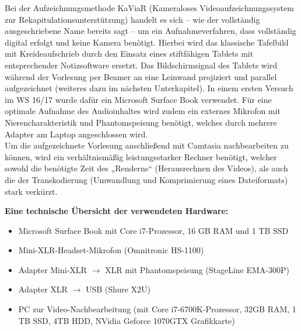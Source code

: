\documentclass{scrreprt}
\begin{document}
Bei der Aufzeichnungsmethode KaViaR (Kameraloses Videoaufzeichnungssystem zur Rekapitulationsunterstützung) handelt es sich -- wie der vollständig ausgeschriebene Name bereits sagt -- um ein Aufnahmeverfahren, dass vollständig digital erfolgt und keine Kamera benötigt. Hierbei wird das klassische Tafelbild mit Kreideaufschrieb durch den Einsatz eines stiftfähigen Tablets mit entsprechender Notizsoftware ersetzt. Das Bildschirmsignal des Tablets wird während der Vorlesung per Beamer an eine Leinwand projiziert und parallel aufgezeichnet (weiteres dazu im nächsten Unterkapitel). In einem ersten Versuch im WS 16/17 wurde dafür ein Microsoft Surface Book verwendet. Für eine optimale Aufnahme des Audioinhaltes wird zudem ein externes Mikrofon mit Nierencharakteristik und Phantomspeisung benötigt, welches durch mehrere Adapter am Laptop angeschlossen wird.
\\Um die aufgezeichnete Vorlesung anschließend mit Camtasia nachbearbeiten zu können, wird ein verhältnismäßig leistungsstarker Rechner benötigt, welcher sowohl die benötigte Zeit des „Renderns“ (Herausrechnen des Videos), als auch die der Transkodierung (Umwandlung und Komprimierung eines Dateiformats) stark verkürzt.

\bigskip
\bigskip
\textbf{Eine technische Übersicht der verwendeten Hardware:}

\begin{itemize}
  \item Microsoft Surface Book mit Core i7-Prozessor, 16 GB RAM und 1 TB SSD
  \item Mini-XLR-Headset-Mikrofon (Omnitronic HS-1100)
  \item Adapter Mini-XLR  $\rightarrow$ XLR mit Phantomspeisung (StageLine EMA-300P)
  \item Adapter XLR  $\rightarrow$ USB (Shure X2U)
  \item PC zur Video-Nachbearbeitung (mit Core i7-6700K-Prozessor, 32GB RAM, 1 TB SSD, 4TB HDD, NVidia Geforce 1070GTX Grafikkarte)
\end{itemize}
\end{document}
